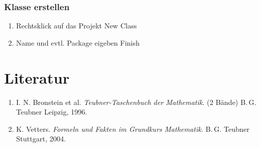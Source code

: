 		\subsubsection{Klasse erstellen}
		\begin{enumerate}
		\item Rechtsklick auf das Projekt \frqq New \frqq Class
		\item Name und evtl. Package eigeben \frqq Finish
		\end{enumerate}

\section{Literatur}

\renewcommand{\labelenumi}{[\arabic{enumi}]}
\renewcommand{\theenumi}{[\arabic{enumi}]}
\begin{enumerate}
\item
I. N. Bronstein et al. \textit{Teubner-Taschenbuch der Mathematik}. (2 Bände)
B.\,G. Teubner Leipzig, 1996.

\item
K. Vetters. \textit{Formeln und Fakten im Grundkurs Mathematik}. B.\,G. Teubner Stuttgart, 2004.

\end{enumerate}
\pagestyle{scrplain}
\ofoot[]{}

\cleardoublepage
%
